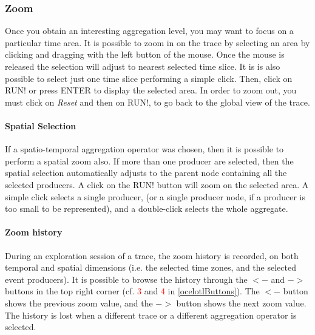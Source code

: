 \documentclass[twoside]{article}
\begin{document}
\begin{sloppypar}
\subsubsection{Zoom}
Once you obtain an interesting aggregation level, you may want to focus on a particular time area. It is possible to zoom in on the trace by selecting an area by clicking and dragging with the left button of the mouse. Once the mouse is released the selection will adjust to nearest selected time slice. It is is also possible to select just one time slice performing a simple click. Then, click on RUN! or press ENTER to display the selected area. In order to zoom out, you must click on \textit{Reset} and then on RUN!, to go back to the global view of the trace.

\paragraph{Spatial Selection}
If a spatio-temporal aggregation operator was chosen, then it is possible to perform a spatial zoom also. If more than one producer are selected, then the spatial selection automatically adjusts to the parent node containing all the selected producers. A click on the RUN! button will zoom on the selected area. A simple click selects a single producer, (or a single producer node, if a producer is too small to be represented), and a double-click selects the whole aggregate.

\paragraph{Zoom history}
During an exploration session of a trace, the zoom history is recorded, on both temporal and spatial dimensions (i.e. the selected time zones, and the selected event producers). It is possible to browse the history through the $<-$ and $->$ buttons in the top right corner (cf. \textcolor{red}{3} and \textcolor{red}{4} in \ref{ocelotlButtons}). The $<-$ button shows the previous zoom value, and the $->$ button shows the next zoom value. The history is lost when a different trace  or a different aggregation operator is selected.


\end{sloppypar}
\end{document}
